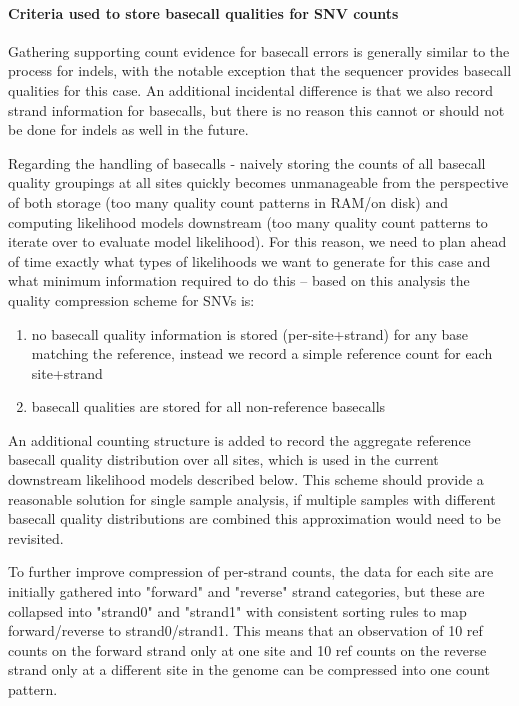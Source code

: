 \documentclass{article}
\begin{document}
\paragraph{Criteria used to store basecall qualities for SNV counts}

Gathering supporting count evidence for basecall errors is generally similar to the process for indels, with the notable exception that the sequencer provides basecall qualities for this case. An additional incidental difference is that we also record strand information for basecalls, but there is no reason this cannot or should not be done for indels as well in the future.

Regarding the handling of basecalls - naively storing  the counts of all basecall quality groupings at all sites quickly becomes unmanageable from the perspective of both storage (too many quality count patterns in RAM/on disk) and computing likelihood models downstream (too many quality count patterns to iterate over to evaluate model likelihood). For this reason, we need to plan ahead of time exactly what types of likelihoods we want to generate for this case and what minimum information required to do this -- based on this analysis the quality compression scheme for SNVs is:

\begin{enumerate}
\item no basecall quality information is stored (per-site+strand) for any base matching the reference, instead we record a simple reference count for each site+strand
\item basecall qualities are stored for all non-reference basecalls
\end{enumerate}

An additional counting structure is added to record the aggregate reference basecall quality distribution over all sites, which is used in the current downstream likelihood models described below. This scheme should provide a reasonable solution for single sample analysis, if multiple samples with different basecall quality distributions are combined this approximation would need to be revisited.

To further improve compression of per-strand counts, the data for each site are initially gathered into "forward" and "reverse" strand categories, but these are collapsed into "strand0" and "strand1" with consistent sorting rules to map forward/reverse to strand0/strand1. This means that an observation of 10 ref counts on the forward strand only at one site and 10 ref counts on the reverse strand only at a different site in the genome can be compressed into one count pattern.
\end{document}
